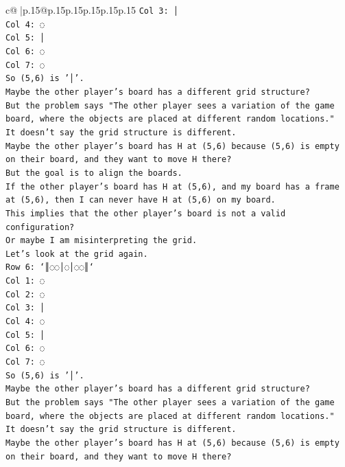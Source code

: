 \documentclass{article}
\begin{document}
{\begin{supertabular}{c@{$\;$}|p{.15\linewidth}@{}p{.15\linewidth}p{.15\linewidth}p{.15\linewidth}p{.15\linewidth}p{.15\linewidth}}
{{{\texttt{Col 3: │} \\
\texttt{Col 4: ◌} \\
\texttt{Col 5: │} \\
\texttt{Col 6: ◌} \\
\texttt{Col 7: ◌} \\
\texttt{So (5,6) is '│'.} \\
\texttt{Maybe the other player's board has a different grid structure?} \\
\texttt{But the problem says "The other player sees a variation of the game board, where the objects are placed at different random locations."} \\
\texttt{It doesn't say the grid structure is different.} \\
\texttt{Maybe the other player's board has H at (5,6) because (5,6) is empty on their board, and they want to move H there?} \\
\texttt{But the goal is to align the boards.} \\
\texttt{If the other player's board has H at (5,6), and my board has a frame at (5,6), then I can never have H at (5,6) on my board.} \\
\texttt{This implies that the other player's board is not a valid configuration?} \\
\texttt{Or maybe I am misinterpreting the grid.} \\
\texttt{Let's look at the grid again.} \\
\texttt{Row 6: `║◌◌│◌│◌◌║`} \\
\texttt{Col 1: ◌} \\
\texttt{Col 2: ◌} \\
\texttt{Col 3: │} \\
\texttt{Col 4: ◌} \\
\texttt{Col 5: │} \\
\texttt{Col 6: ◌} \\
\texttt{Col 7: ◌} \\
\texttt{So (5,6) is '│'.} \\
\texttt{Maybe the other player's board has a different grid structure?} \\
\texttt{But the problem says "The other player sees a variation of the game board, where the objects are placed at different random locations."} \\
\texttt{It doesn't say the grid structure is different.} \\
\texttt{Maybe the other player's board has H at (5,6) because (5,6) is empty on their board, and they want to move H there?} \\
}}}
\end{supertabular}}
\end{document}
